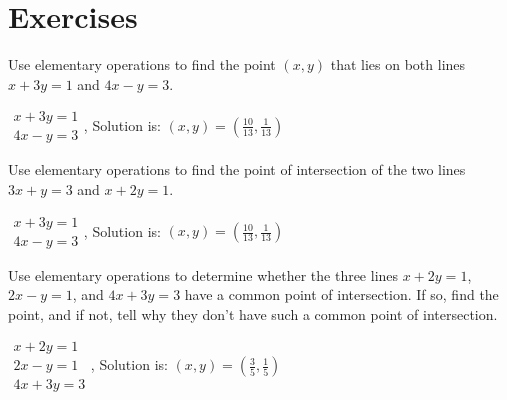 \section*{Exercises}

\begin{enumialphparenastyle}

\begin{ex}
  Use elementary operations to find the point $\left(x,y\right)$
  that lies on both lines $x+3y=1$ and $4x-y=3$.
  \begin{sol}
    $\begin{array}{c}
       x+3y=1 \\
       4x-y=3
     \end{array}
    $, Solution is: $(x,y) = \left(\frac{10}{13},\frac{1}{13}\right)$
  \end{sol}
\end{ex}
 
\begin{ex}
  Use elementary operations to find the point of intersection of the
  two lines $ 3x+y=3$ and $x+2y=1.$
  \begin{sol}
    $\begin{array}{c}
       x+3y=1 \\
       4x-y=3
     \end{array}
    $, Solution is: $(x,y) = \left(\frac{10}{13},\frac{1}{13}\right)$
  \end{sol}
\end{ex}


\begin{ex}
  Use elementary operations to determine whether the three lines
  $x+2y=1$, $2x-y=1$, and $4x+3y=3$ have a common point of intersection.
  If so, find the point, and if not, tell why they don't have such a
  common point of intersection.
  \begin{sol}
    $\begin{array}{c}
       x+2y=1 \\
       2x-y=1 \\
       4x+3y=3
     \end{array}
    $, Solution is: $(x,y) = \left(\frac{3}{5},\frac{1}{5}\right)$
  \end{sol}
\end{ex}


\end{enumialphparenastyle}
